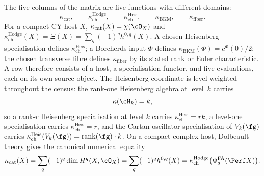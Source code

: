The five columns of the matrix are five functions with different
domains:
\[
 \kappa_{\mathrm{cat}},\qquad
 \kappa^{\mathrm{Hodge}}_{\mathrm{ch}},\qquad
 \kappa^{\mathrm{Heis}}_{\mathrm{ch}},\qquad
 \kappa_{\mathrm{BKM}},\qquad
 \kappa_{\mathrm{fiber}}.
\]
For a compact CY host \(X\),
\(\kappa_{\mathrm{cat}}(X)=\chi(\cO_X)\) and
\(\kappa^{\mathrm{Hodge}}_{\mathrm{ch}}(X)
=\Xi(X)=\sum_q(-1)^qh^{0,q}(X)\).
A chosen Heisenberg specialisation defines
\(\kappa^{\mathrm{Heis}}_{\mathrm{ch}}\);
a Borcherds input
\(\Phi\) defines
\(\kappa_{\mathrm{BKM}}(\Phi)=c^\Phi(0)/2\);
the chosen transverse fibre defines
\(\kappa_{\mathrm{fiber}}\) by its stated rank or Euler
characteristic.  A row therefore consists of a host, a specialisation
functor, and five evaluations, each on its own source object.
The Heisenberg coordinate is level-weighted throughout the census:
the rank-one Heisenberg algebra at level~$k$ carries
\begin{equation}\label{eq:heisenberg-kappa}
\kappa(\cH_k) = k,
\end{equation}
so a rank-$r$ Heisenberg specialisation at level $k$ carries
\(\kappa^{\mathrm{Heis}}_{\mathrm{ch}}=rk\), a level-one
specialisation carries \(\kappa^{\mathrm{Heis}}_{\mathrm{ch}}=r\),
and the Cartan-oscillator specialisation of \(V_k(\fg)\) carries
\(\kappa^{\mathrm{Heis}}_{\mathrm{ch}}(V_k(\fg))
=\operatorname{rank}(\fg)\cdot k\).
On a compact complex host, Dolbeault theory gives the canonical
numerical equality
\[
\kappa_{\mathrm{cat}}(X)
=\sum_q(-1)^q\dim H^q(X,\cO_X)
=\sum_q(-1)^qh^{0,q}(X)
=\kappa_{\mathrm{ch}}^{\mathrm{Hodge}}
\bigl(\PhiFA_d(\Perf X)\bigr).
\]

